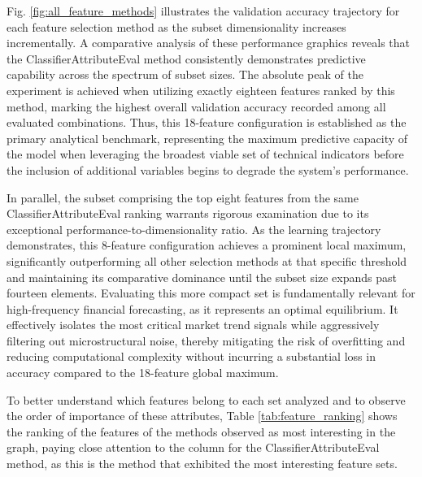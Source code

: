 \documentclass{ieeeaccess}
\begin{document}
Fig. \ref{fig:all_feature_methods} illustrates the validation accuracy trajectory for each feature selection method as the subset dimensionality increases incrementally. A comparative analysis of these performance graphics reveals that the ClassifierAttributeEval method consistently demonstrates predictive capability across the spectrum of subset sizes. The absolute peak of the experiment is achieved when utilizing exactly eighteen features ranked by this method, marking the highest overall validation accuracy recorded among all evaluated combinations. Thus, this 18-feature configuration is established as the primary analytical benchmark, representing the maximum predictive capacity of the model when leveraging the broadest viable set of technical indicators before the inclusion of additional variables begins to degrade the system's performance.

In parallel, the subset comprising the top eight features from the same ClassifierAttributeEval ranking warrants rigorous examination due to its exceptional performance-to-dimensionality ratio. As the learning trajectory demonstrates, this 8-feature configuration achieves a prominent local maximum, significantly outperforming all other selection methods at that specific threshold and maintaining its comparative dominance until the subset size expands past fourteen elements. Evaluating this more compact set is fundamentally relevant for high-frequency financial forecasting, as it represents an optimal equilibrium. It effectively isolates the most critical market trend signals while aggressively filtering out microstructural noise, thereby mitigating the risk of overfitting and reducing computational complexity without incurring a substantial loss in accuracy compared to the 18-feature global maximum.

To better understand which features belong to each set analyzed and to observe the order of importance of these attributes, Table \ref{tab:feature_ranking} shows the ranking of the features of the methods observed as most interesting in the graph, paying close attention to the column for the ClassifierAttributeEval method, as this is the method that exhibited the most interesting feature sets.
\end{document}
